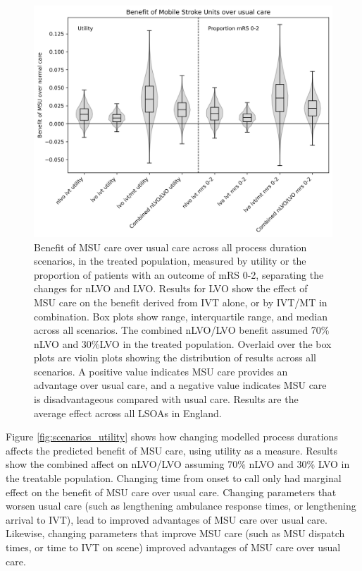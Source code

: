 \begin{figure}[h!]
    \centering
    \includegraphics[width=0.75\linewidth]{images/scenario_results_summary.png}
    \caption{Benefit of MSU care over usual care across all process duration scenarios, in the treated population, measured by utility or the proportion of patients with an outcome of mRS 0-2, separating the changes for nLVO and LVO. Results for LVO show the effect of MSU care on the benefit derived from IVT alone, or by IVT/MT in combination. Box plots show range, interquartile range, and median across all scenarios. The combined nLVO/LVO benefit assumed 70\% nLVO and 30\%LVO in the treated population. Overlaid over the box plots are violin plots showing the distribution of results across all scenarios. A positive value indicates MSU care provides an advantage over usual care, and a negative value indicates MSU care is disadvantageous compared with usual care. Results are the average effect across all LSOAs in England.}
    \label{fig:scenarios_overview}
\end{figure}



Figure \ref{fig:scenarios_utility} shows how changing modelled process durations affects the predicted benefit of MSU care, using utility as a measure. Results show the combined affect on nLVO/LVO assuming 70\% nLVO and 30\% LVO  in the treatable population. Changing time from onset to call only had marginal effect on the benefit of MSU care over usual care. Changing parameters that worsen usual care (such as lengthening ambulance response times, or lengthening arrival to IVT), lead to improved advantages of MSU care over usual care. Likewise, changing parameters that improve MSU care (such as MSU dispatch times, or time to IVT on scene) improved advantages of MSU care over usual care.

